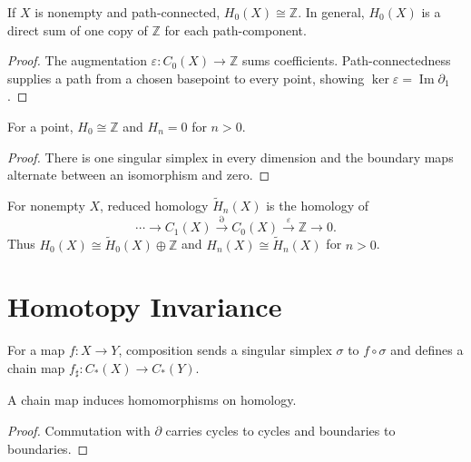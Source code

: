 \begin{proposition}
\label{prop:h0-path-connected}

If $X$ is nonempty and path-connected, $H_0(X)\cong\mathbb{Z}$.  In general, $H_0(X)$ is a direct sum of one copy of $\mathbb{Z}$ for each path-component.
\end{proposition}
\begin{proof}
\sketch The augmentation $\varepsilon:C_0(X)\to\mathbb{Z}$ sums coefficients.  Path-connectedness supplies a path from a chosen basepoint to every point, showing $\ker\varepsilon=\operatorname{Im}\partial_1$.
\end{proof}

\begin{proposition}
\label{prop:homology-point}

For a point, $H_0\cong\mathbb{Z}$ and $H_n=0$ for $n>0$.
\end{proposition}
\begin{proof}
\sketch There is one singular simplex in every dimension and the boundary maps alternate between an isomorphism and zero.
\end{proof}

For nonempty $X$, reduced homology $\widetilde H_n(X)$ is the homology of
\[
\cdots\to C_1(X)\xrightarrow{\partial}C_0(X)\xrightarrow{\varepsilon}\mathbb{Z}\to0.
\]
Thus $H_0(X)\cong\widetilde H_0(X)\oplus\mathbb{Z}$ and $H_n(X)\cong\widetilde H_n(X)$ for $n>0$.

\section*{Homotopy Invariance}

For a map $f:X\to Y$, composition sends a singular simplex $\sigma$ to $f\circ\sigma$ and defines a chain map $f_\sharp:C_*(X)\to C_*(Y)$.

\begin{proposition}
\label{prop:chain-map-induces-homology-homomorphism}

A chain map induces homomorphisms on homology.
\end{proposition}
\begin{proof}
\sketch Commutation with $\partial$ carries cycles to cycles and boundaries to boundaries.
\end{proof}

